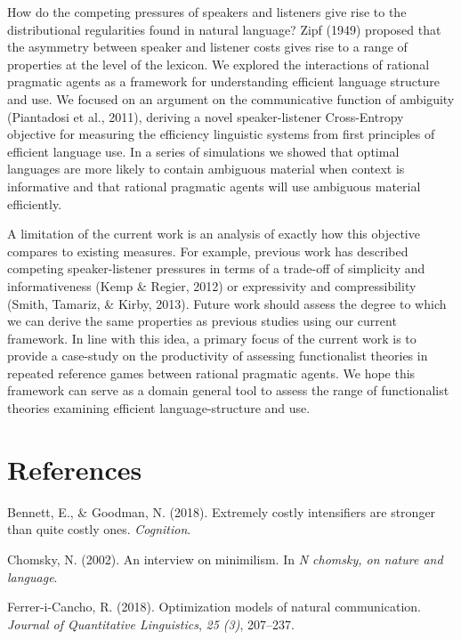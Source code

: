 \documentclass[10pt, letterpaper]{article}
\begin{document}
How do the competing pressures of speakers and listeners give rise to
the distributional regularities found in natural language? Zipf (1949)
proposed that the asymmetry between speaker and listener costs gives
rise to a range of properties at the level of the lexicon. We explored
the interactions of rational pragmatic agents as a framework for
understanding efficient language structure and use. We focused on an
argument on the communicative function of ambiguity (Piantadosi et al.,
2011), deriving a novel speaker-listener Cross-Entropy objective for
measuring the efficiency linguistic systems from first principles of
efficient language use. In a series of simulations we showed that
optimal languages are more likely to contain ambiguous material when
context is informative and that rational pragmatic agents will use
ambiguous material efficiently.\par

A limitation of the current work is an analysis of exactly how this
objective compares to existing measures. For example, previous work has
described competing speaker-listener pressures in terms of a trade-off
of simplicity and informativeness (Kemp \& Regier, 2012) or expressivity
and compressibility (Smith, Tamariz, \& Kirby, 2013). Future work should
assess the degree to which we can derive the same properties as previous
studies using our current framework. In line with this idea, a primary
focus of the current work is to provide a case-study on the productivity
of assessing functionalist theories in repeated reference games between
rational pragmatic agents. We hope this framework can serve as a domain
general tool to assess the range of functionalist theories examining
efficient language-structure and use.\par

\section{References}\label{references}

\setlength{\parindent}{-0.1in} \setlength{\leftskip}{0.125in} \noindent

\hypertarget{refs}{}
\hypertarget{ref-BennettGoodman2015a}{}
Bennett, E., \& Goodman, N. (2018). Extremely costly intensifiers are
stronger than quite costly ones. \emph{Cognition}.

\hypertarget{ref-Chomsky2002a}{}
Chomsky, N. (2002). An interview on minimilism. In \emph{N chomsky, on
nature and language}.

\hypertarget{ref-FerreriCancho2018a}{}
Ferrer-i-Cancho, R. (2018). Optimization models of natural
communication. \emph{Journal of Quantitative Linguistics}, \emph{25
(3)}, 207--237.
\end{document}
